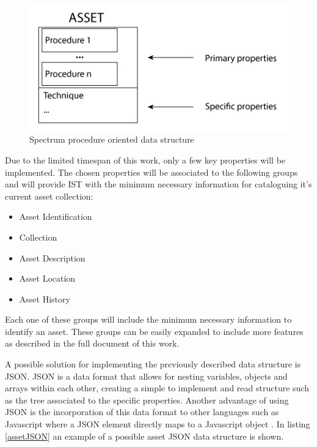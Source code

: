 \begin{figure}[h!]
    \centering
    \includegraphics[scale=0.35]{images/Architecture/Data-structure-2.jpg}
    \caption[Data structure 2]{Spectrum procedure oriented data structure}
    \label{dataStructure2}
\end{figure}

Due to the limited timespan of this work, only a few key properties will be implemented. The chosen properties will be associated to the following groups and will provide IST with the minimum necessary information for cataloguing it's current asset collection:

\begin{itemize}
    \item Asset Identification
    \item Collection
    \item Asset Description
    \item Asset Location
    \item Asset History
\end{itemize}

Each one of these groups will include the minimum necessary information to identify an asset. These groups can be easily expanded to include more features as described in the full document of this work.

A possible solution for implementing the previously described data structure is JSON. JSON is a data format that allows for nesting variables, objects and arrays within each other, creating a simple to implement and read structure such as the tree associated to the specific properties. Another advantage of using JSON is the incorporation of this data format to other languages such as Javascript where a JSON element directly maps to a Javascript object \cite{Rischpater2015JavaScriptCookbook}.
    In listing \ref{assetJSON} an example of a possible asset JSON data structure is shown.
    
